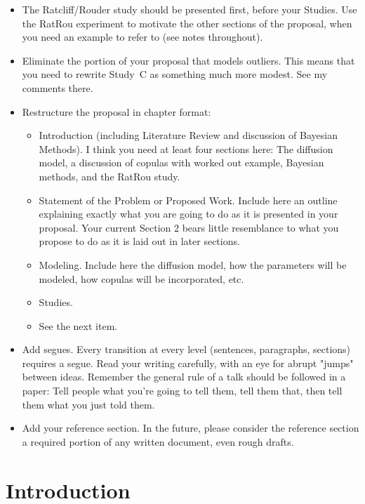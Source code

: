 \documentclass[12pt]{article}
\begin{document}
{\begin{itemize}
\item The Ratcliff/Rouder study should be presented first, before your
      Studies.  Use the RatRou experiment to motivate the other
      sections of the proposal, when you need an example to refer to
      (see notes throughout).
\item Eliminate the portion of your proposal that models outliers.
      This means that you need to rewrite Study~C as something much more
      modest.  See my comments there.
\item Restructure the proposal in chapter format: 
\begin{itemize}
      \item Introduction (including Literature Review and discussion
      of Bayesian Methods).  I think you need at least four sections
      here: The diffusion model, a discussion of copulas with worked
      out example, Bayesian methods, and the RatRou study.
      \item Statement of the Problem or Proposed Work.  Include here
      an outline explaining exactly what you are going to do as it is
      presented in your proposal.  Your current Section 2 bears little
      resemblance to what you propose to do as it is laid out in later
      sections.
      \item Modeling.  Include here the diffusion model, how the
      parameters will be modeled, how copulas will be incorporated,
      etc.
      \item Studies.
      \item See the next item.
\end{itemize}
\item Add segues.  Every transition at every level (sentences,
      paragraphs, sections) requires a segue.  Read your writing
      carefully, with an eye for abrupt "jumps" between ideas.
      Remember the general rule of a talk should be followed in a
      paper: Tell people what you're going to tell them, tell them
      that, then tell them what you just told them. 
\item Add your reference section.  In the future, please consider the
      reference section a required portion of any written document, even
      rough drafts.  
\end{itemize}

\section{Introduction}

}
\end{document}
